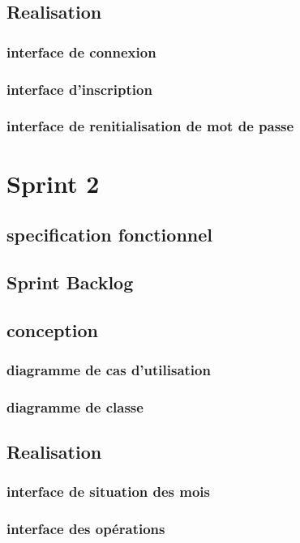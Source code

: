 \subsection{Realisation}
\subsubsection{interface de connexion}
\subsubsection{interface d'inscription}
\subsubsection{interface de renitialisation de mot de passe}



\section{Sprint 2}
\subsection{specification fonctionnel}
\subsection{Sprint Backlog}
\subsection{conception}
\subsubsection{diagramme de cas d'utilisation}

\subsubsection{diagramme de classe}

\subsection{Realisation}
\subsubsection{interface de situation des mois}
\subsubsection{interface des opérations}



